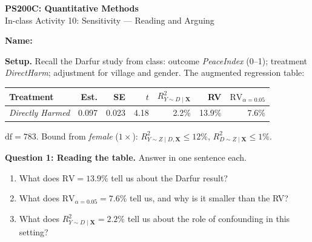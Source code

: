 \documentclass[11pt]{article}
\newcommand{\X}{{\bm X}}
\begin{document}
\begin{center}
{\Large \textbf{PS200C: Quantitative Methods}} \\[6pt]
{\large In-class Activity 10: Sensitivity --- Reading and Arguing}
\end{center}

\vspace{4pt}
\noindent\textbf{Name:} \hrulefill

\vspace{12pt}

\noindent\textbf{Setup.}  Recall the Darfur study from class: outcome \textit{PeaceIndex} (0--1); treatment \textit{DirectHarm}; adjustment for village and gender. The augmented regression table:

\medskip
\begin{center}
\begin{tabular}{lrrrrrr}
\toprule
Treatment & Est. & SE & $t$ & $R^2_{Y\sim D\mid \X}$ & RV & $\mathrm{RV}_{\alpha=0.05}$ \\
\midrule
\textit{Directly Harmed} & 0.097 & 0.023 & 4.18 & 2.2\% & 13.9\% & 7.6\% \\
\bottomrule
\end{tabular}
\end{center}
\medskip

\noindent $\mathrm{df} = 783$.  Bound from \textit{female} ($1\times$): $R^2_{Y\sim Z \mid D, \X} \leq 12\%$, $R^2_{D\sim Z \mid \X} \leq 1\%$.

\vspace{14pt}

\noindent\textbf{Question 1: Reading the table.}  Answer in one sentence each.

\medskip
\begin{enumerate}[label=(\alph*)]
\item What does $\mathrm{RV} = 13.9\%$ tell us about the Darfur result?
\vspace{3.5cm}

\item What does $\mathrm{RV}_{\alpha=0.05} = 7.6\%$ tell us, and why is it smaller than the RV?
\vspace{4cm}

\item What does $R^2_{Y\sim D \mid \X} = 2.2\%$ tell us about the role of confounding in this setting?
\vspace{2.5cm}
\end{enumerate}

\newpage
\end{document}
